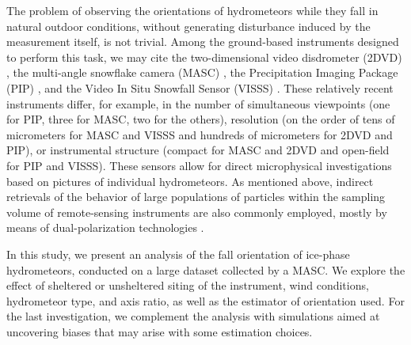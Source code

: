 \documentclass[draft]{agujournal2019}
\begin{document}
The problem of observing the orientations of hydrometeors while they fall in natural outdoor conditions, without generating disturbance induced by the measurement itself, is not trivial. Among the ground-based instruments designed to perform this task, we may cite the two-dimensional video disdrometer (2DVD) \cite{Kruger_JAOT_2002}, the multi-angle snowflake camera (MASC) \cite{Garrett_AMT_2012}, the Precipitation Imaging Package (PIP) \cite{Pettersen_atmosphere_2020}, and the Video In Situ Snowfall Sensor (VISSS) \cite{Maahn_AMT_2024}. These relatively recent instruments differ, for example, in the number of simultaneous viewpoints (one for PIP, three for MASC, two for the others), resolution (on the order of tens of micrometers for MASC and VISSS and hundreds of micrometers for 2DVD and PIP), or instrumental structure (compact for MASC and 2DVD and open-field for PIP and VISSS). These sensors allow for direct microphysical investigations based on pictures of individual hydrometeors. As mentioned above, indirect retrievals of the behavior of large populations of particles within the sampling volume of remote-sensing instruments are also commonly employed, mostly by means of dual-polarization technologies \cite{Matrosov_JAS_2005}.

In this study, we present an analysis of the fall orientation of ice-phase hydrometeors, conducted on a large dataset collected by a MASC. We explore the effect of sheltered or unsheltered siting of the instrument, wind conditions, hydrometeor type, and axis ratio, as well as the estimator of orientation used. For the last investigation, we complement the analysis with simulations aimed at uncovering biases that may arise with some estimation choices.
\end{document}
